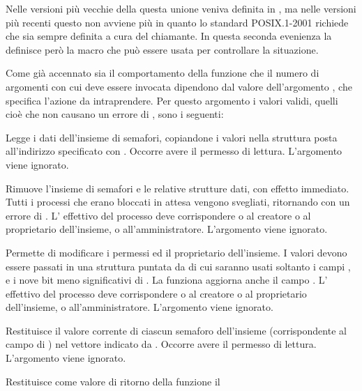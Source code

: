 Nelle versioni più vecchie della  questa unione veniva definita in
, ma nelle versioni più recenti questo non avviene più in
quanto lo standard POSIX.1-2001 richiede che sia sempre definita a cura del
chiamante. In questa seconda evenienza la  definisce però la
macro  che può essere usata per controllare la
situazione.

Come già accennato sia il comportamento della funzione che il numero di
argomenti con cui deve essere invocata dipendono dal valore dell'argomento
, che specifica l'azione da intraprendere. Per questo argomento i
valori validi, quelli cioè che non causano un errore di , sono
i seguenti:
\begin{basedescript}{\desclabelwidth{1.6cm}\desclabelstyle{\nextlinelabel}}
\item[\const{IPC\_STAT}] Legge i dati dell'insieme di semafori, copiandone i
  valori nella struttura  posta all'indirizzo specificato
  con . Occorre avere il permesso di lettura.
  L'argomento  viene ignorato.
\item[\const{IPC\_RMID}] Rimuove l'insieme di semafori e le relative strutture
  dati, con effetto immediato. Tutti i processi che erano bloccati in attesa
  vengono svegliati, ritornando con un errore di .  L'
  effettivo del processo deve corrispondere o al creatore o al proprietario
  dell'insieme, o all'amministratore. L'argomento
   viene ignorato.
\item[\const{IPC\_SET}] Permette di modificare i permessi ed il proprietario
  dell'insieme. I valori devono essere passati in una struttura
   puntata da  di cui saranno usati soltanto
  i campi ,  e i nove bit meno
  significativi di . La funziona aggiorna anche il campo
  .  L' effettivo del processo deve corrispondere o
  al creatore o al proprietario dell'insieme, o all'amministratore.
  L'argomento  viene ignorato.
\item[\constd{GETALL}] Restituisce il valore corrente di ciascun semaforo
  dell'insieme (corrispondente al campo  di ) nel
  vettore indicato da . Occorre avere il permesso di lettura.
  L'argomento  viene ignorato.
\item[\constd{GETNCNT}] Restituisce come valore di ritorno della funzione il

\end{basedescript}

